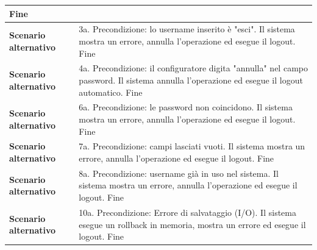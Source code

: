 \documentclass[12pt, a4paper, oneside]{report}
\begin{document}
\begin{tabularx}{\textwidth}{|l|X|}
    Fine \\ \hline
    \textbf{Scenario alternativo} & 
    3a. Precondizione: lo username inserito è "esci".\newline
    Il sistema mostra un errore, annulla l'operazione ed esegue il logout.\newline
    Fine \\ \hline
    \textbf{Scenario alternativo} & 
    4a. Precondizione: il configuratore digita "annulla" nel campo password.\newline
    Il sistema annulla l'operazione ed esegue il logout automatico.\newline
    Fine \\ \hline
    \textbf{Scenario alternativo} & 
    6a. Precondizione: le password non coincidono.\newline
    Il sistema mostra un errore, annulla l'operazione ed esegue il logout.\newline
    Fine \\ \hline
    \textbf{Scenario alternativo} & 
    7a. Precondizione: campi lasciati vuoti.\newline
    Il sistema mostra un errore, annulla l'operazione ed esegue il logout.\newline
    Fine \\ \hline
    \textbf{Scenario alternativo} & 
    8a. Precondizione: username già in uso nel sistema.\newline
    Il sistema mostra un errore, annulla l'operazione ed esegue il logout.\newline
    Fine \\ \hline
    \textbf{Scenario alternativo} & 
    10a. Precondizione: Errore di salvataggio (I/O).\newline
    Il sistema esegue un rollback in memoria, mostra un errore ed esegue il logout.\newline
    Fine \\ \hline
\end{tabularx}
\end{document}
